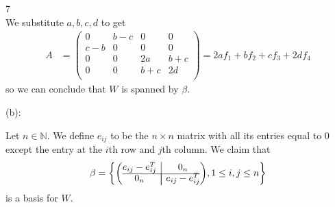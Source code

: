 \documentclass{article}
\makeatletter
\newenvironment{amatrix}[1]{%
  \left(\begin{array}{@{}*{#1}{c}|c@{}}
}{%
  \end{array}\right)
}
\theoremstyle{plain} %
\numberwithin{thm}{section} %
\theoremstyle{definition}
\makeatother
\begin{document}
\begin{question}{7}
\[        \]
        We substitute \(a,b,c,d\) to get
        \begin{align*}
            A &= \begin{pmatrix}
                0 & b - c & 0 &  0 \\
                c - b & 0 & 0 &  0 \\
                0 & 0 & 2a &  b + c \\
                0 & 0 & b + c &  2d \\
            \end{pmatrix}
            = 2af_1 + bf_2 + cf_3 + 2df_4
        \end{align*}
        so we can conclude that \(W\) is spanned by \(\beta\).

        \medskip

        (b):

        Let \(n \in \mathbb{N}\). We define \(e_{ij}\) to be the \(n\times n\) matrix with all its entries equal to 0 except the entry at the \(i\)th row and \(j\)th column. We claim that
        \[
            \beta = \left\{ \begin{amatrix}{1}
                e_{ij} - e_{ij}^T & 0_n \\
                \hline \\[-13pt]
                0_n & e_{ij} - e_{ij}^T
            \end{amatrix}, 1 \leq i,j \leq n\right\} 
        \]
        is a basis for \(W\).


\end{question}
\end{document}
